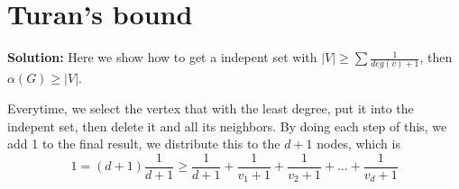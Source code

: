 \section{Turan's bound}

{\bf Solution:} Here we show how to get a indepent set with $|V|\ge\sum\frac{1}{deg(v)+1}$, then $\alpha(G)\ge|V|$.

Everytime, we select the vertex that with the least degree, put it into the indepent set, then delete it and all its neighbors. By doing each step of this, we add 1 to the final result, we distribute this to the $d+1$ nodes, which is 
\[
1 = (d+1)\frac{1}{d+1} \ge \frac{1}{d+1} + \frac{1}{v_1+1} + \frac{1}{v_2+1}+\dots+\frac{1}{v_d+1} 
\]